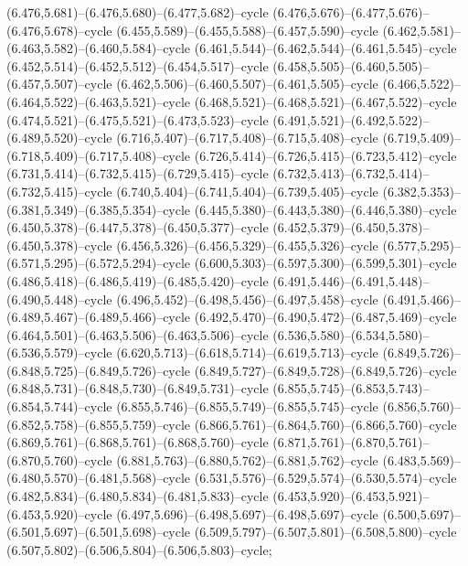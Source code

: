 (6.476,5.681)--(6.476,5.680)--(6.477,5.682)--cycle (6.476,5.676)--(6.477,5.676)--(6.476,5.678)--cycle (6.455,5.589)--(6.455,5.588)--(6.457,5.590)--cycle (6.462,5.581)--(6.463,5.582)--(6.460,5.584)--cycle (6.461,5.544)--(6.462,5.544)--(6.461,5.545)--cycle (6.452,5.514)--(6.452,5.512)--(6.454,5.517)--cycle (6.458,5.505)--(6.460,5.505)--(6.457,5.507)--cycle (6.462,5.506)--(6.460,5.507)--(6.461,5.505)--cycle (6.466,5.522)--(6.464,5.522)--(6.463,5.521)--cycle (6.468,5.521)--(6.468,5.521)--(6.467,5.522)--cycle (6.474,5.521)--(6.475,5.521)--(6.473,5.523)--cycle (6.491,5.521)--(6.492,5.522)--(6.489,5.520)--cycle (6.716,5.407)--(6.717,5.408)--(6.715,5.408)--cycle (6.719,5.409)--(6.718,5.409)--(6.717,5.408)--cycle (6.726,5.414)--(6.726,5.415)--(6.723,5.412)--cycle (6.731,5.414)--(6.732,5.415)--(6.729,5.415)--cycle (6.732,5.413)--(6.732,5.414)--(6.732,5.415)--cycle (6.740,5.404)--(6.741,5.404)--(6.739,5.405)--cycle (6.382,5.353)--(6.381,5.349)--(6.385,5.354)--cycle (6.445,5.380)--(6.443,5.380)--(6.446,5.380)--cycle (6.450,5.378)--(6.447,5.378)--(6.450,5.377)--cycle (6.452,5.379)--(6.450,5.378)--(6.450,5.378)--cycle (6.456,5.326)--(6.456,5.329)--(6.455,5.326)--cycle (6.577,5.295)--(6.571,5.295)--(6.572,5.294)--cycle (6.600,5.303)--(6.597,5.300)--(6.599,5.301)--cycle (6.486,5.418)--(6.486,5.419)--(6.485,5.420)--cycle (6.491,5.446)--(6.491,5.448)--(6.490,5.448)--cycle (6.496,5.452)--(6.498,5.456)--(6.497,5.458)--cycle (6.491,5.466)--(6.489,5.467)--(6.489,5.466)--cycle (6.492,5.470)--(6.490,5.472)--(6.487,5.469)--cycle (6.464,5.501)--(6.463,5.506)--(6.463,5.506)--cycle (6.536,5.580)--(6.534,5.580)--(6.536,5.579)--cycle (6.620,5.713)--(6.618,5.714)--(6.619,5.713)--cycle (6.849,5.726)--(6.848,5.725)--(6.849,5.726)--cycle (6.849,5.727)--(6.849,5.728)--(6.849,5.726)--cycle (6.848,5.731)--(6.848,5.730)--(6.849,5.731)--cycle (6.855,5.745)--(6.853,5.743)--(6.854,5.744)--cycle (6.855,5.746)--(6.855,5.749)--(6.855,5.745)--cycle (6.856,5.760)--(6.852,5.758)--(6.855,5.759)--cycle (6.866,5.761)--(6.864,5.760)--(6.866,5.760)--cycle (6.869,5.761)--(6.868,5.761)--(6.868,5.760)--cycle (6.871,5.761)--(6.870,5.761)--(6.870,5.760)--cycle (6.881,5.763)--(6.880,5.762)--(6.881,5.762)--cycle (6.483,5.569)--(6.480,5.570)--(6.481,5.568)--cycle (6.531,5.576)--(6.529,5.574)--(6.530,5.574)--cycle (6.482,5.834)--(6.480,5.834)--(6.481,5.833)--cycle (6.453,5.920)--(6.453,5.921)--(6.453,5.920)--cycle (6.497,5.696)--(6.498,5.697)--(6.498,5.697)--cycle (6.500,5.697)--(6.501,5.697)--(6.501,5.698)--cycle (6.509,5.797)--(6.507,5.801)--(6.508,5.800)--cycle (6.507,5.802)--(6.506,5.804)--(6.506,5.803)--cycle;
